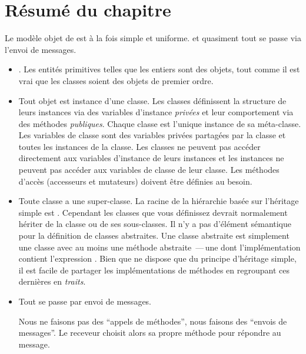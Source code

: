 \documentclass[a4paper,10pt,twoside]{book}
\begin{document}
\section{Résumé du chapitre}

Le modèle objet de \pharo est à la fois simple et uniforme.
\Mantra et quasiment tout se passe via l'envoi de messages. %

\begin{itemize}

  \item \Mantra.
  Les entités primitives telles que les entiers sont des objets, tout comme
il est vrai que les classes soient des objets de premier ordre.

  \item Tout objet est instance d'une classe.
Les classes définissent la structure de leurs instances via des
variables d'instance \emph{privées} et leur comportement 
via des méthodes \emph{publiques}. Chaque classe est l'unique
instance de sa méta-classe.
Les variables de classe sont des variables privées partagées par la classe
et toutes les instances de la classe.
Les classes ne peuvent pas accéder directement aux variables d'instance de
leurs instances et les instances ne peuvent pas accéder aux variables de
classe de leur classe.
Les méthodes d'accès (accesseurs et mutateurs) doivent être
définies au besoin.  

  \item Toute classe a une super-classe.
  La racine de la hiérarchie basée sur l'héritage simple est .
	Cependant les classes que vous définissez devrait normalement hériter de la classe  ou de ses sous-classes.
Il n'y a pas d'élément sémantique pour la définition de classes abstraites.
Une classe abstraite est simplement une classe avec au moins une méthode abstraite
\,---\,une dont l'implémentation contient l'expression 
.
  Bien que \pharo ne dispose que du principe d'héritage simple, 
il est facile de partager les implémentations de méthodes
en regroupant ces dernières en \emph{traits}.

  \item Tout se passe par envoi de messages. %

	Nous ne faisons pas des ``appels de méthodes'', nous faisons des ``envois de messages''.
        Le receveur choisit alors sa propre méthode pour répondre au message.


\end{itemize}
\end{document}

